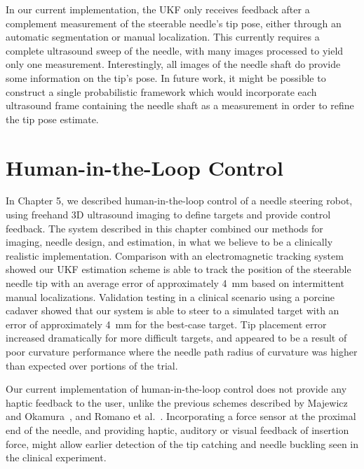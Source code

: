 In our current implementation, the UKF only receives feedback after a complement measurement of the steerable needle's tip pose, either through an automatic segmentation or manual localization. This currently requires a complete ultrasound sweep of the needle, with many images processed to yield only one measurement. Interestingly, all images of the needle shaft do provide some information on the tip's pose. In future work, it might be possible to construct a single probabilistic framework which would incorporate each ultrasound frame containing the needle shaft as a measurement in order to refine the tip pose estimate.

\section{Human-in-the-Loop Control} 
In Chapter 5, we described human-in-the-loop control of a needle steering robot, using freehand 3D ultrasound imaging to define targets and provide control feedback. The system described in this chapter combined our methods for imaging, needle design, and estimation, in what we believe to be a clinically realistic implementation. Comparison with an electromagnetic tracking system showed our UKF estimation scheme is able to track the position of the steerable needle tip with an average error of approximately 4~mm based on intermittent manual localizations. Validation testing in a clinical scenario using a porcine cadaver showed that our system is able to steer to a simulated target with an error of approximately 4~mm for the best-case target. Tip placement error increased dramatically for more difficult targets, and appeared to be a result of poor curvature performance where the needle path radius of curvature was higher than expected over portions of the trial. 

Our current implementation of human-in-the-loop control does not provide any haptic feedback to the user, unlike the previous schemes described by Majewicz and Okamura~\cite{Majewicz2013}, and Romano et al.~\cite{Romano2007}. Incorporating a force sensor at the proximal end of the needle, and providing haptic, auditory or visual feedback of insertion force, might allow earlier detection of the tip catching and needle buckling seen in the clinical experiment. 

